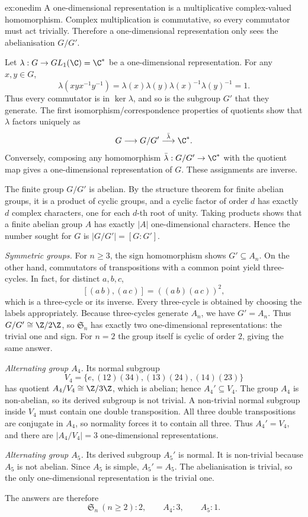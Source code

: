 \begin{solution}{ex:onedim}
\idea A one-dimensional representation is a multiplicative complex-valued homomorphism. Complex multiplication is commutative, so every commutator must act trivially. Therefore a one-dimensional representation only sees the abelianisation $G/G'$.

\writeup Let $\lambda:G\to GL_1(\C)=\C^*$ be a one-dimensional representation. For any $x,y\in G$,
\[
\lambda(xyx^{-1}y^{-1})
=\lambda(x)\lambda(y)\lambda(x)^{-1}\lambda(y)^{-1}=1.
\]
Thus every commutator is in $\ker\lambda$, and so is the subgroup $G'$ that they generate. The first isomorphism/correspondence properties of quotients show that $\lambda$ factors uniquely as
\[
G\longrightarrow G/G'\overset{\bar\lambda}{\longrightarrow}\C^*.
\]
Conversely, composing any homomorphism $\bar\lambda:G/G'\to\C^*$ with the quotient map gives a one-dimensional representation of $G$. These assignments are inverse.

The finite group $G/G'$ is abelian. By the structure theorem for finite abelian groups, it is a product of cyclic groups, and a cyclic factor of order $d$ has exactly $d$ complex characters, one for each $d$-th root of unity. Taking products shows that a finite abelian group $A$ has exactly $|A|$ one-dimensional characters. Hence the number sought for $G$ is $|G/G'|=[G:G']$.

\emph{Symmetric groups.} For $n\ge3$, the sign homomorphism shows $G'\subseteq A_n$. On the other hand, commutators of transpositions with a common point yield three-cycles. In fact, for distinct $a,b,c$,
\[
[(a\,b),(a\,c)]
=((a\,b)(a\,c))^2,
\]
which is a three-cycle or its inverse. Every three-cycle is obtained by choosing the labels appropriately. Because three-cycles generate $A_n$, we have $G'=A_n$. Thus $G/G'\cong\Z/2\Z$, so $\mathfrak S_n$ has exactly two one-dimensional representations: the trivial one and sign. For $n=2$ the group itself is cyclic of order $2$, giving the same answer.

\emph{Alternating group $A_4$.} Its normal subgroup
\[
V_4=\{e,(12)(34),(13)(24),(14)(23)\}
\]
has quotient $A_4/V_4\cong\Z/3\Z$, which is abelian; hence $A_4'\subseteq V_4$. The group $A_4$ is non-abelian, so its derived subgroup is not trivial. A non-trivial normal subgroup inside $V_4$ must contain one double transposition. All three double transpositions are conjugate in $A_4$, so normality forces it to contain all three. Thus $A_4'=V_4$, and there are $|A_4/V_4|=3$ one-dimensional representations.

\emph{Alternating group $A_5$.} Its derived subgroup $A_5'$ is normal. It is non-trivial because $A_5$ is not abelian. Since $A_5$ is simple, $A_5'=A_5$. The abelianisation is trivial, so the only one-dimensional representation is the trivial one.

The answers are therefore
\[
\boxed{\mathfrak S_n\ (n\ge2):2,\qquad A_4:3,\qquad A_5:1.}
\]
\end{solution}

